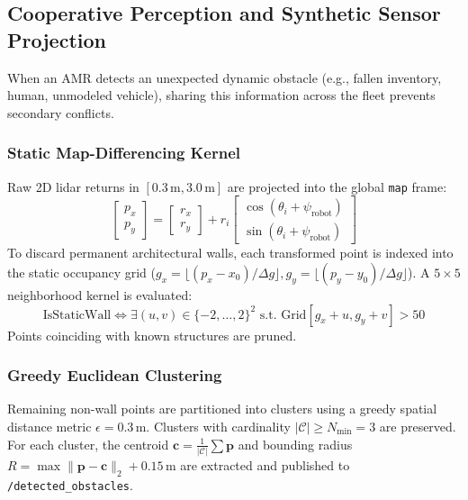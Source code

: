 \documentclass[10pt,twocolumn,a4paper]{article}
\theoremstyle{definition}
\begin{document}
\subsection{Cooperative Perception and Synthetic Sensor Projection}
When an AMR detects an unexpected dynamic obstacle (e.g., fallen inventory, human, unmodeled vehicle), sharing this information across the fleet prevents secondary conflicts.

\subsubsection{Static Map-Differencing Kernel}
Raw 2D lidar returns in $[0.3\,\text{m}, 3.0\,\text{m}]$ are projected into the global \texttt{map} frame:
\begin{equation}
    \begin{bmatrix} p_x \\ p_y \end{bmatrix} = \begin{bmatrix} r_x \\ r_y \end{bmatrix} + r_i \begin{bmatrix} \cos(\theta_i + \psi_{\text{robot}}) \\ \sin(\theta_i + \psi_{\text{robot}}) \end{bmatrix}
\end{equation}
To discard permanent architectural walls, each transformed point is indexed into the static occupancy grid ($g_x = \lfloor(p_x - x_0)/\Delta g\rfloor, g_y = \lfloor(p_y - y_0)/\Delta g\rfloor$). A $5 \times 5$ neighborhood kernel is evaluated:
\begin{equation}
    \text{IsStaticWall} \iff \exists (u, v) \in \{-2, \dots, 2\}^2 \text{ s.t. } \text{Grid}[g_x + u, g_y + v] > 50
\end{equation}
Points coinciding with known structures are pruned.

\subsubsection{Greedy Euclidean Clustering}
Remaining non-wall points are partitioned into clusters using a greedy spatial distance metric $\epsilon = 0.3\,\text{m}$. Clusters with cardinality $|\mathcal{C}| \ge N_{\min} = 3$ are preserved. For each cluster, the centroid $\mathbf{c} = \frac{1}{|\mathcal{C}|}\sum \mathbf{p}$ and bounding radius $R = \max \|\mathbf{p} - \mathbf{c}\|_2 + 0.15\,\text{m}$ are extracted and published to \texttt{/detected\_obstacles}.
\end{document}
